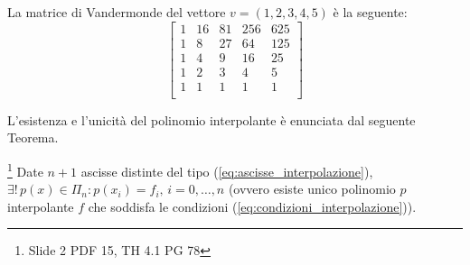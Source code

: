 \begin{example}
	La matrice di Vandermonde del vettore $v=(1, 2, 3, 4, 5)$ è la seguente:
	\begin{equation*}
		\begin{bmatrix}
			1 &	16	& 81	& 256	& 625\\
			1 &	8 &	27	& 64	& 125\\
			1 &	4 &	9 &	16 &	25\\
			1 &	2 &	3 &	4 &	5\\
			1 &	1 &	1 &	1 &	1 \\
		\end{bmatrix}
	\end{equation*}
\end{example}

L'esistenza e l'unicità del polinomio interpolante è enunciata dal seguente Teorema.
\begin{theorem}\label{th:esistenza_unicita_polinomio_interpolante}\footnote{Slide 2 PDF 15, TH 4.1 PG 78}
    Date $n+1$ ascisse distinte del tipo (\ref{eq:ascisse_interpolazione}), $\exists!\, p(x)\in\Pi_n: p(x_i)=f_i,\, i=0,\hdots,n$ (ovvero esiste unico polinomio $p$ interpolante $f$ che soddisfa le condizioni (\ref{eq:condizioni_interpolazione})).
\end{theorem}
